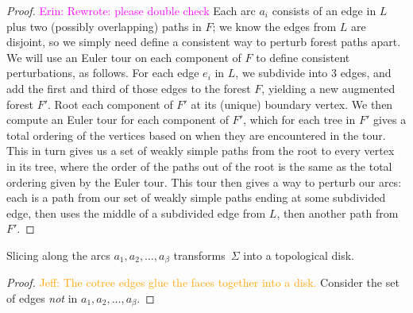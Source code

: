 \documentclass[letterpaper,review]{siamart190516}
\def\jnote#1{\textcolor{orange}{Jeff: #1}}
\def\enote#1{\textcolor{magenta}{Erin: #1}}
\begin{document}
\begin{proof} 
\enote{Rewrote: please double check}
Each arc $a_i$ consists of an edge in $L$ plus two (possibly overlapping) paths in $F$; we know the edges from $L$ are disjoint, so we simply need define a consistent way to perturb forest paths apart.  
We will use an Euler tour on each component of $F$ to define consistent perturbations, as follows.
For each edge $e_i$ in $L$, we subdivide into 3 edges, and add the first and third of those edges to the forest $F$, yielding a new augmented forest $F'$.  Root each component of $F'$ at its (unique) boundary vertex.
We then compute an Euler tour for each component of $F'$, which for each tree in $F'$ gives a total ordering of the vertices based on when they are encountered in the tour.
This in turn gives us a set of weakly simple paths from the root to every vertex in its tree, where the order of the paths out of the root is the same as the total ordering given by the Euler tour.
This tour then gives a way to perturb our arcs: each is a path from our set of weakly simple paths ending at some subdivided edge, then uses the middle of a subdivided edge from $L$, then another path from $F'$.   
\end{proof}

\begin{lemma}
\label{lem:disk}
Slicing along the arcs $a_1, a_2, \dots, a_\beta$ transforms~$\Sigma$ into a topological disk.
\end{lemma}

\begin{proof}
\jnote{The cotree edges glue the faces together into a disk.}
Consider the set of edges \emph{not} in  $a_1, a_2, \dots, a_\beta$.
\end{proof}
\end{document}
